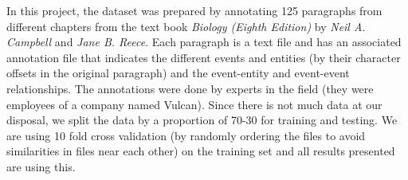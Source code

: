 In this project, the dataset was prepared by annotating 125 paragraphs from different chapters from the text book {\em Biology (Eighth Edition)} by {\em Neil A. Campbell} and {\em Jane B. Reece}. Each paragraph is a text file and has an associated annotation file that indicates the different events and entities (by their character offsets in the original paragraph) and the event-entity and event-event relationships. The annotations were done by experts in the field (they were employees of a company named Vulcan). Since there is not much data at our disposal, we split the data by a proportion of 70-30 for training and testing. We are using 10 fold cross validation (by randomly ordering the files to avoid similarities in files near each other) on the training set and all results presented are using this.